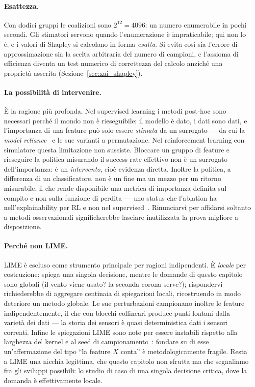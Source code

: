 \paragraph{Esattezza.} Con dodici gruppi le coalizioni sono $2^{12}=4096$: un numero
enumerabile in pochi secondi. Gli stimatori servono quando l'enumerazione \`e
impraticabile; qui non lo \`e, e i valori di Shapley si calcolano in forma
\emph{esatta}. Si evita cos\`i sia l'errore di approssimazione sia la scelta arbitraria
del numero di campioni, e l'assioma di efficienza diventa un test numerico di
correttezza del calcolo anzich\'e una propriet\`a asserita
(Sezione~\ref{sec:xai_shapley}).

\paragraph{La possibilit\`a di intervenire.} \`E la ragione pi\`u profonda. Nel
supervised learning i metodi post-hoc sono necessari perch\'e il mondo non \`e
rieseguibile: il modello \`e dato, i dati sono dati, e l'importanza di una feature pu\`o
solo essere \emph{stimata} da un surrogato --- da cui la \emph{model
reliance}~\cite{model_reliance} e le sue varianti a permutazione. Nel reinforcement
learning con simulatore questa limitazione non sussiste. Bloccare un gruppo di feature
e rieseguire la politica misurando il success rate effettivo non \`e un surrogato
dell'importanza: \`e un \emph{intervento}, cio\`e evidenza diretta. Inoltre la politica,
a differenza di un classificatore, non \`e un fine ma un mezzo per un ritorno
misurabile, il che rende disponibile una metrica di importanza definita sul compito e
non sulla funzione di perdita --- uno status che l'ablation ha nell'explainability per
RL e non nel supervised~\cite{xrl_survey}. Rinunciarvi per affidarsi soltanto a metodi
osservazionali significherebbe lasciare inutilizzata la prova migliore a disposizione.

\paragraph{Perch\'e non LIME.} LIME \`e escluso come strumento principale per ragioni
indipendenti. \`E \emph{locale} per costruzione: spiega una singola decisione, mentre le
domande di questo capitolo sono globali (il vento viene usato? la seconda corona
serve?); rispondervi richiederebbe di aggregare centinaia di spiegazioni locali,
ricostruendo in modo deteriore un metodo globale. Le sue perturbazioni campionano
inoltre le feature indipendentemente, il che con blocchi collineari produce punti
lontani dalla variet\`a dei dati --- la storia dei sensori \`e quasi deterministica dati
i sensori correnti. Infine le spiegazioni LIME sono note per essere instabili rispetto
alla larghezza del kernel e al seed di campionamento~\cite{robustness_interp}: fondare
su di esse un'affermazione del tipo ``la feature $X$ conta'' \`e metodologicamente
fragile. Resta a LIME una nicchia legittima, che questo capitolo non sfrutta ma che
segnaliamo fra gli sviluppi possibili: lo studio di caso di una singola decisione
critica, dove la domanda \`e effettivamente locale.

